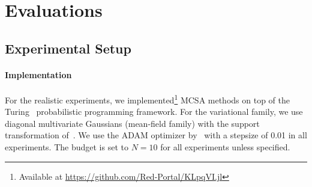 
\vspace{-1ex}
\section{Evaluations}\label{section:eval}
\vspace{-1.5ex}
\subsection{Experimental Setup}
\vspace{-1.5ex}
\paragraph{Implementation}
For the realistic experiments, we implemented\footnote{Available at \url{https://github.com/Red-Portal/KLpqVI.jl}} MCSA methods on top of the Turing~\citep{ge2018t} probabilistic programming framework.
For the variational family, we use diagonal multivariate Gaussians (mean-field family) with the support transformation of~\citet{JMLR:v18:16-107}.
We use the ADAM optimizer by~\citet{kingma_adam_2015} with a stepsize of 0.01 in all experiments.
The budget is set to \(N=10\) for all experiments unless specified.

